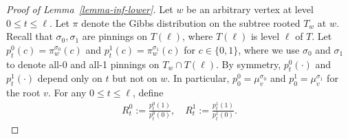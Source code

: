 \documentclass{theoretics}
\newcommand{\defeq}{:=}
\begin{document}
\begin{proof}[Proof of Lemma~\ref{lemma-inf-lower}]
Let $w$ be an arbitrary vertex at level $0 \leq t \leq \ell$. 
Let $\pi$ denote the Gibbs distribution on the subtree rooted $T_w$ at $w$.
Recall that $\sigma_0,\sigma_1$ are pinnings on $T(\ell)$, where $T(\ell)$ is level $\ell$ of $T$.
Let $p^0_t(c) = \pi^{\sigma_0}_w(c)$ and $p^1_t(c) = \pi^{\sigma_1}_w(c)$ for $c \in \{0,1\}$, where we use $\sigma_{0}$ and $\sigma_1$ to denote all-0 and all-1 pinnings on $T_w \cap T(\ell)$.  By symmetry, $p^0_t(\cdot)$ and $p^1_t(\cdot)$ depend only on $t$ but not on $w$. In particular, $p^0_0 = \mu_v^{\sigma_0}$ and $p^1_0 = \mu_v^{\sigma_1}$ for the root $v$. For any $0 \leq t \leq \ell$, define
\begin{align*}
	R^0_t \defeq \frac{p^0_t(1)}{p^0_t(0)}, \quad R^1_t \defeq \frac{p^1_t(1)}{p^1_t(0)}.
\end{align*}


\end{proof}
\end{document}
